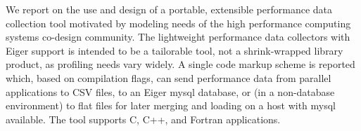 We report on the use and design of a portable, extensible performance data collection tool motivated by modeling needs of the high performance computing systems co-design community. The lightweight performance data collectors with Eiger support is intended to be a tailorable tool, not a shrink-wrapped library product, as profiling needs vary widely. A single code markup scheme is reported which, based on compilation flags, can send performance data from parallel applications to CSV files, to an Eiger mysql database, or (in a non-database environment) to flat files for later merging and loading on a host with mysql available. The tool supports C, C++, and Fortran applications.

